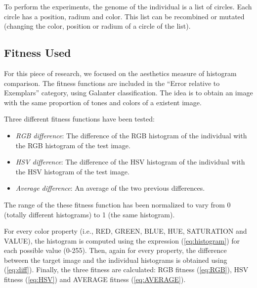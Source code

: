 To perform the experiments, the genome of the individual is a list of
circles. Each circle has a position, radium and color. This list can
be recombined or mutated (changing the color, position or radium of a
circle of the list). %

\subsection{Fitness Used}
For this piece of research, we focused on the aesthetics measure of
histogram comparison. The fitness functions are included in the
``Error relative to Exemplars'' category, using Galanter
\cite{galanter2012computational} classification. The idea is to obtain
an image with the same proportion of tones and colors of a 
existent image. %

Three different fitness functions have been tested:
\begin{itemize}
\item {\em RGB difference}: The difference of the RGB histogram of the individual with the RGB histogram of the test image.
\item {\em HSV difference}: The difference of the HSV histogram of the individual with the HSV histogram of the test image.
\item {\em Average difference}: An average of the two previous differences.
\end{itemize}

The range of the these fitness function has been normalized to vary from 0 (totally different histograms) to 1 (the same histogram).

For every color property (i.e., RED, GREEN, BLUE, HUE, SATURATION and VALUE), the histogram is computed using the expression (\ref{eq:histogram}) for each possible value (0-255). Then, again for every property, the difference between the target image and the individual histograms is obtained using (\ref{eq:diff}). Finally, the three fitness are calculated: RGB fitness (\ref{eq:RGB}), HSV fitness (\ref{eq:HSV}) and AVERAGE fitness (\ref{eq:AVERAGE}).

